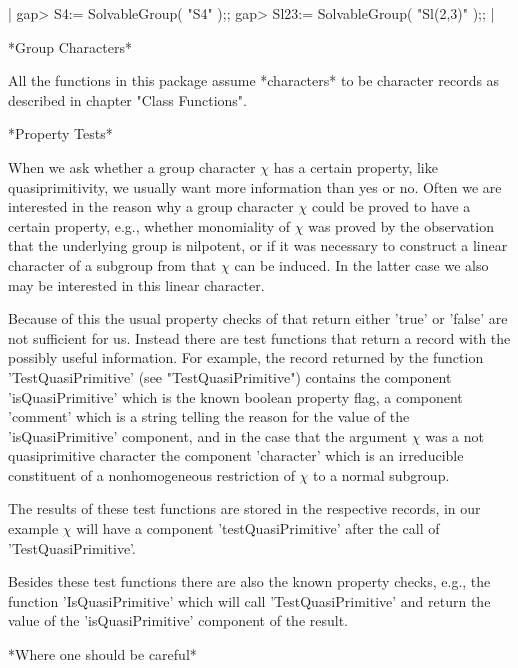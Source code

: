 |    gap> S4:= SolvableGroup( "S4" );;
    gap> Sl23:= SolvableGroup( "Sl(2,3)" );; |


*Group Characters*

All the functions in this package assume *characters* to be character records
as described in chapter "Class Functions".

\vspace{5mm}

*Property Tests*

When we ask whether a group character $\chi$ has a certain property, like
quasiprimitivity, we usually want more information than yes or no.
Often we are interested in the reason why a group character $\chi$ could be
proved to have a certain property, e.g., whether monomiality of $\chi$
was proved by the observation that the underlying group is nilpotent, or 
if it was necessary to construct a linear character of a subgroup from that
$\chi$ can be induced.  In the latter case we also may be interested in this
linear character.

Because of this the usual property checks of {\GAP} that return either 'true'
or 'false' are not sufficient for us.
Instead there are test functions that return a record with the possibly
useful information.
For example, the record returned by the function 'TestQuasiPrimitive'
(see "TestQuasiPrimitive") contains the component 'isQuasiPrimitive' which is
the known boolean property flag, a component 'comment' which is a string
telling the reason for the value of the 'isQuasiPrimitive' component,
and in the case that the argument $\chi$ was a not quasiprimitive character
the component 'character' which is an irreducible constituent of a
nonhomogeneous restriction of $\chi$ to a normal subgroup.

The results of these test functions are stored in the respective records,
in our example $\chi$ will have a component 'testQuasiPrimitive' after
the call of 'TestQuasiPrimitive'.

Besides these test functions there are also the known property checks,
e.g., the function 'IsQuasiPrimitive' which will call 'TestQuasiPrimitive'
and return the value of the 'isQuasiPrimitive' component of the result.

\vspace{5mm}

*Where one should be careful*


